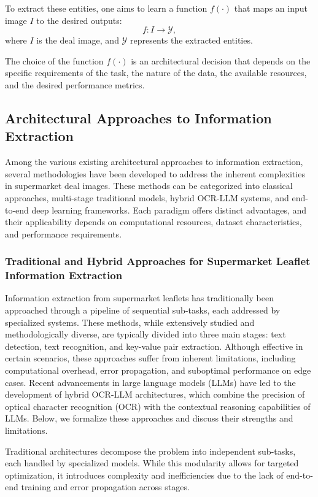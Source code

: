 \documentclass[11pt]{article}
\begin{document}
To extract these entities, one aims to learn a function \(f(\cdot)\) that maps an input image \(I\) to the desired outputs:
\begin{equation}
    f: I \to \mathcal{Y},
\end{equation}
where \( I \) is the deal image, and \( \mathcal{Y} \) represents the extracted entities.

The choice of the function \( f(\cdot) \) is an architectural decision that depends on the specific requirements of the task, the nature of the data, the available resources, and the desired performance metrics. 

\subsection{Architectural Approaches to Information Extraction}
Among the various existing architectural approaches to information extraction, several methodologies have been developed to address the inherent complexities in supermarket deal images. These methods can be categorized into classical approaches, multi-stage traditional models, hybrid OCR-LLM systems, and end-to-end deep learning frameworks. Each paradigm offers distinct advantages, and their applicability depends on computational resources, dataset characteristics, and performance requirements.

\subsubsection{Traditional and Hybrid Approaches for Supermarket Leaflet Information Extraction}  
Information extraction from supermarket leaflets has traditionally been approached through a pipeline of sequential sub-tasks, each addressed by specialized systems. These methods, while extensively studied and methodologically diverse, are typically divided into three main stages: text detection, text recognition, and key-value pair extraction. Although effective in certain scenarios, these approaches suffer from inherent limitations, including computational overhead, error propagation, and suboptimal performance on edge cases. Recent advancements in large language models (LLMs) have led to the development of hybrid OCR-LLM architectures, which combine the precision of optical character recognition (OCR) with the contextual reasoning capabilities of LLMs. Below, we formalize these approaches and discuss their strengths and limitations.

Traditional architectures decompose the problem into independent sub-tasks, each handled by specialized models. While this modularity allows for targeted optimization, it introduces complexity and inefficiencies due to the lack of end-to-end training and error propagation across stages.
\end{document}
